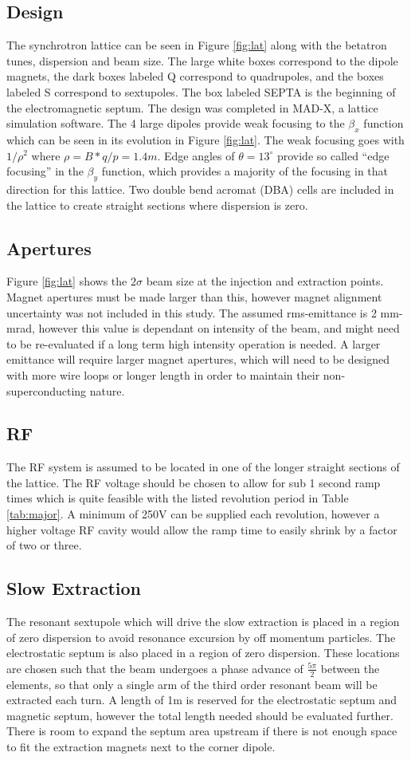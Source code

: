 \subsection{Design}
The synchrotron lattice can be seen in Figure \ref{fig:lat} along with the betatron tunes, dispersion and beam size.  The large white boxes correspond to the dipole
magnets, the dark boxes labeled Q correspond to quadrupoles, and the boxes labeled S correspond to sextupoles.  The box labeled SEPTA is the beginning of the 
electromagnetic septum.  The design was completed in MAD-X, a lattice simulation software.  The 4 large dipoles provide weak focusing to the $\beta_x$ function which 
can be seen in its evolution in Figure \ref{fig:lat}.  The weak focusing goes with $1/\rho^2$ where $\rho = B * q/p = 1.4m$.  Edge angles of $\theta = 13^\circ$ provide
so called ``edge focusing'' in the $\beta_y$ function, which provides a majority of the focusing in that direction for this lattice. Two double bend acromat (DBA) cells
are included in the lattice to create straight  sections where dispersion is zero.  
\subsection{Apertures} 
Figure \ref{fig:lat} shows the $2\sigma$ beam size at the injection and extraction points. Magnet apertures must be made larger than this, however magnet alignment
uncertainty was not included in this study. The assumed rms-emittance is 2 mm-mrad, however this value is dependant on intensity of the beam, and might need to 
be re-evaluated if a long term high intensity operation is needed.  A larger emittance will require larger magnet apertures, which will need to be designed with
more wire loops or longer length in order to maintain their non-superconducting nature.  
\subsection{RF}
The RF system is assumed to be located in one of the longer straight sections of the lattice.  The RF voltage should be chosen to allow for sub 1 second ramp times which
is quite feasible with the listed revolution period in Table \ref{tab:major}.  A minimum of 250V can be supplied each revolution, however a higher voltage RF cavity 
would allow the ramp time to easily shrink by a factor of two or three. 
\subsection{Slow Extraction}
The resonant sextupole which will drive the slow extraction is placed in a region of zero dispersion to avoid resonance excursion by off momentum particles.  The 
electrostatic septum is also placed in a region of zero dispersion.  These locations are chosen such that the beam 
undergoes a phase advance of $\frac{5\pi}{2}$ between the elements, so that only a single arm of
the third order resonant beam will be extracted each turn.  A length of 1m is reserved for the electrostatic septum and magnetic septum, however the total length
needed should be evaluated further.  There is room to expand the septum area upstream if there is not enough space to fit the extraction magnets next to the 
corner dipole.  
